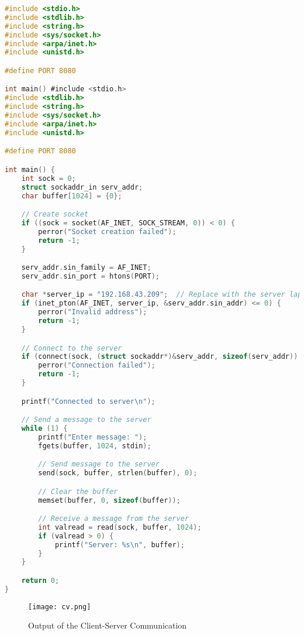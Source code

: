 \documentclass[12pt]{article}
\begin{document}
\begin{lstlisting}[language=C, caption={Client Code for Client-Server Communication}]
#include <stdio.h>
#include <stdlib.h>
#include <string.h>
#include <sys/socket.h>
#include <arpa/inet.h>
#include <unistd.h>

#define PORT 8080

int main() #include <stdio.h>
#include <stdlib.h>
#include <string.h>
#include <sys/socket.h>
#include <arpa/inet.h>
#include <unistd.h>

#define PORT 8080

int main() {
    int sock = 0;
    struct sockaddr_in serv_addr;
    char buffer[1024] = {0};

    // Create socket
    if ((sock = socket(AF_INET, SOCK_STREAM, 0)) < 0) {
        perror("Socket creation failed");
        return -1;
    }

    serv_addr.sin_family = AF_INET;
    serv_addr.sin_port = htons(PORT);

    char *server_ip = "192.168.43.209";  // Replace with the server laptop's IP address
    if (inet_pton(AF_INET, server_ip, &serv_addr.sin_addr) <= 0) {
        perror("Invalid address");
        return -1;
    }

    // Connect to the server
    if (connect(sock, (struct sockaddr*)&serv_addr, sizeof(serv_addr)) < 0) {
        perror("Connection failed");
        return -1;
    }

    printf("Connected to server\n");

    // Send a message to the server
    while (1) {
        printf("Enter message: ");
        fgets(buffer, 1024, stdin);

        // Send message to the server
        send(sock, buffer, strlen(buffer), 0);

        // Clear the buffer
        memset(buffer, 0, sizeof(buffer));

        // Receive a message from the server
        int valread = read(sock, buffer, 1024);
        if (valread > 0) {
            printf("Server: %s\n", buffer);
        }
    }

    return 0;
}

\end{lstlisting}




\begin{figure}[h!]
    \centering
    \texttt{[image: cv.png]}
    \caption{Output of the Client-Server Communication}
    \label{fig:server_output}
\end{figure}
\end{document}
